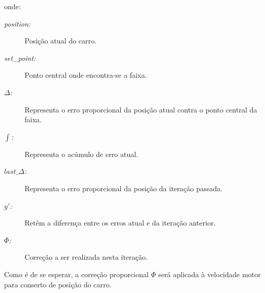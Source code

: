 \documentclass[portugues, brazil, a4paper,12pt]{article}
\begin{document}
	onde:
	\begin{description}
		\item[\textit{position:}] Posição atual do carro.
		
		\item[\textit{set\_point:}] Ponto central onde encontra-se a faixa.
		
		\item[$ \Delta $\textit{:}] Representa o erro proporcional da posição atual contra o ponto central da faixa.
		
		\item[$ \int $\textit{:}] Representa o acúmulo de erro atual.
		
		\item[$ last\_\Delta $\textit{:}] Representa o erro proporcional da posição da iteração passada.
		
		\item[$ y' $\textit{:}] Retêm a diferença entre os erros atual e da iteração anterior.
		
		\item[$ \Phi $\textit{:}] Correção a ser realizada nesta iteração.
	\end{description}
	
	Como é de se esperar, a correção proporcional $ \Phi $ será aplicada à velocidade motor para conserto de posição do carro.


%
	
\end{document}
